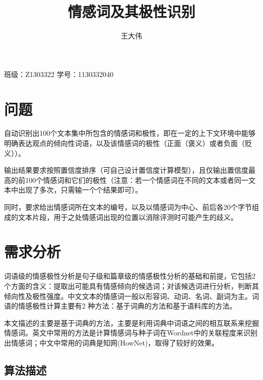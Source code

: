 \documentclass[11pt,a4paper]{article}
\author{王大伟}
\title{情感词及其极性识别}
\begin{document}
 


\maketitle
\begin{center}
班级：Z1303322
学号：1130332040
\end{center}

\newpage

\tableofcontents
\newpage

\section{问题}

自动识别出100个文本集中所包含的情感词和极性，即在一定的上下文环境中能够明确表达观点的倾向性词语，以及该情感词的极性（正面（褒义）或者负面（贬义））。

输出结果要求按照置信度排序（可自己设计置信度计算模型），且仅输出置信度最高的前100个情感词和它们的极性（注意：若一个情感词在不同的文本或者同一文本中出现了多次，只需输一个个结果即可）。

同时，要求给出情感词所在文本的编号，以及以情感词为中心、前后各20个字节组成的文本片段，用于之处情感词出现的位置以消除评测时可能产生的歧义。

\section{需求分析}

词语级的情感极性分析是句子级和篇章级的情感极性分析的基础和前提，它包括2个方面的含义：提取出可能具有情感倾向的候选词；对该候选词进行分析，判断其倾向性及极性强度。中文文本的情感词一般以形容词、动词、名词、副词为主。词语的情感极性计算主要有2 种方法：基于词典的方法和基于语料库的方法。

本文描述的主要是基于词典的方法，主要是利用词典中词语之间的相互联系来挖掘情感词。英文中常用的方法是计算情感词与种子词在Wordnet中的关联程度来识别出情感词；中文中常用的词典是知网(HowNet)，取得了较好的效果。


\subsection{算法描述}
\end{document}
